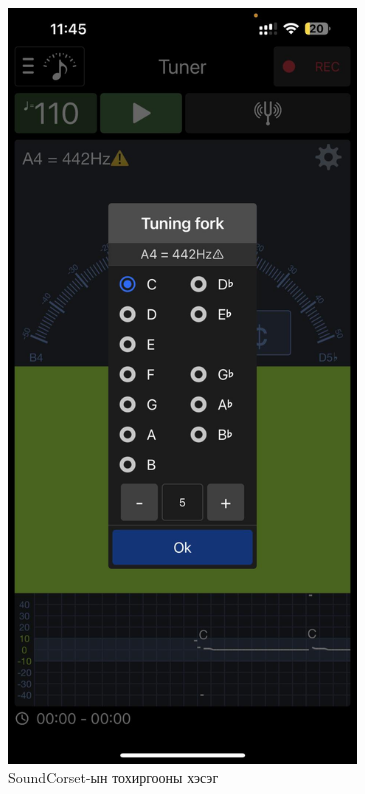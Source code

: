 \clearpage
\clearpage
\begin{figure}[h]
	\centering
	\includegraphics[height=20cm]{images/soundcorset1.jpg}
	\caption{SoundCorset-ын тохиргооны хэсэг}
	\label{fig:modalform}
\end{figure}
\clearpage
